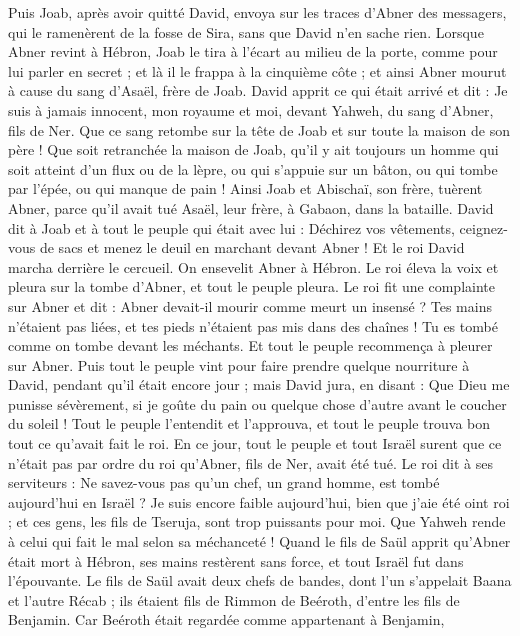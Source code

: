 \begin{multicols}{2}
Puis Joab, après avoir quitté David, envoya sur les traces d'Abner des messagers, qui le ramenèrent de la fosse de Sira, sans que David n'en sache rien.
Lorsque Abner revint à Hébron, Joab le tira à l'écart au milieu de la porte, comme pour lui parler en secret ; et là il le frappa à la cinquième côte ; et ainsi Abner mourut à cause du sang d'Asaël, frère de Joab.
David apprit ce qui était arrivé et dit : Je suis à jamais innocent, mon royaume et moi, devant Yahweh, du sang d'Abner, fils de Ner.
Que ce sang retombe sur la tête de Joab et sur toute la maison de son père ! Que soit retranchée la maison de Joab, qu'il y ait toujours un homme qui soit atteint d'un flux ou de la lèpre, ou qui s'appuie sur un bâton, ou qui tombe par l'épée, ou qui manque de pain !
Ainsi Joab et Abischaï, son frère, tuèrent Abner, parce qu'il avait tué Asaël, leur frère, à Gabaon, dans la bataille.
David dit à Joab et à tout le peuple qui était avec lui : Déchirez vos vêtements, ceignez-vous de sacs et menez le deuil en marchant devant Abner ! Et le roi David marcha derrière le cercueil.
On ensevelit Abner à Hébron. Le roi éleva la voix et pleura sur la tombe d'Abner, et tout le peuple pleura.
Le roi fit une complainte sur Abner et dit : Abner devait-il mourir comme meurt un insensé ?
Tes mains n'étaient pas liées, et tes pieds n'étaient pas mis dans des chaînes ! Tu es tombé comme on tombe devant les méchants. Et tout le peuple recommença à pleurer sur Abner.
Puis tout le peuple vint pour faire prendre quelque nourriture à David, pendant qu'il était encore jour ; mais David jura, en disant : Que Dieu me punisse sévèrement, si je goûte du pain ou quelque chose d'autre avant le coucher du soleil !
Tout le peuple l'entendit et l'approuva, et tout le peuple trouva bon tout ce qu'avait fait le roi.
En ce jour, tout le peuple et tout Israël surent que ce n'était pas par ordre du roi qu'Abner, fils de Ner, avait été tué.
Le roi dit à ses serviteurs : Ne savez-vous pas qu'un chef, un grand homme, est tombé aujourd'hui en Israël ?
Je suis encore faible aujourd'hui, bien que j'aie été oint roi ; et ces gens, les fils de Tseruja, sont trop puissants pour moi. Que Yahweh rende à celui qui fait le mal selon sa méchanceté !
\VerseOne{}Quand le fils de Saül apprit qu'Abner était mort à Hébron, ses mains restèrent sans force, et tout Israël fut dans l'épouvante.
Le fils de Saül avait deux chefs de bandes, dont l'un s'appelait Baana et l'autre Récab ; ils étaient fils de Rimmon de Beéroth, d'entre les fils de Benjamin. Car Beéroth était regardée comme appartenant à Benjamin,

\end{multicols}
